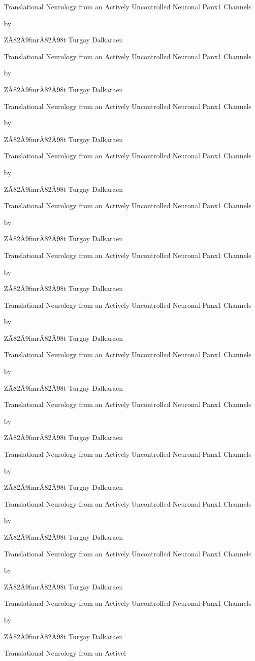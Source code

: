 \documentclass{article}
\begin{document}
Translational Neurology from an Actively Uncontrolled Neuronal Panx1 Channels

by

ZÃ\x82Â\x9fmrÃ\x82Â\x98t Turgay Dalkaraen

Translational Neurology from an Actively Uncontrolled Neuronal Panx1 Channels

by

ZÃ\x82Â\x9fmrÃ\x82Â\x98t Turgay Dalkaraen

Translational Neurology from an Actively Uncontrolled Neuronal Panx1 Channels

by

ZÃ\x82Â\x9fmrÃ\x82Â\x98t Turgay Dalkaraen

Translational Neurology from an Actively Uncontrolled Neuronal Panx1 Channels

by

ZÃ\x82Â\x9fmrÃ\x82Â\x98t Turgay Dalkaraen

Translational Neurology from an Actively Uncontrolled Neuronal Panx1 Channels

by

ZÃ\x82Â\x9fmrÃ\x82Â\x98t Turgay Dalkaraen

Translational Neurology from an Actively Uncontrolled Neuronal Panx1 Channels

by

ZÃ\x82Â\x9fmrÃ\x82Â\x98t Turgay Dalkaraen

Translational Neurology from an Actively Uncontrolled Neuronal Panx1 Channels

by

ZÃ\x82Â\x9fmrÃ\x82Â\x98t Turgay Dalkaraen

Translational Neurology from an Actively Uncontrolled Neuronal Panx1 Channels

by

ZÃ\x82Â\x9fmrÃ\x82Â\x98t Turgay Dalkaraen

Translational Neurology from an Actively Uncontrolled Neuronal Panx1 Channels

by

ZÃ\x82Â\x9fmrÃ\x82Â\x98t Turgay Dalkaraen

Translational Neurology from an Actively Uncontrolled Neuronal Panx1 Channels

by

ZÃ\x82Â\x9fmrÃ\x82Â\x98t Turgay Dalkaraen

Translational Neurology from an Actively Uncontrolled Neuronal Panx1 Channels

by

ZÃ\x82Â\x9fmrÃ\x82Â\x98t Turgay Dalkaraen

Translational Neurology from an Actively Uncontrolled Neuronal Panx1 Channels

by

ZÃ\x82Â\x9fmrÃ\x82Â\x98t Turgay Dalkaraen

Translational Neurology from an Actively Uncontrolled Neuronal Panx1 Channels

by

ZÃ\x82Â\x9fmrÃ\x82Â\x98t Turgay Dalkaraen

Translational Neurology from an Activel
\end{document}
